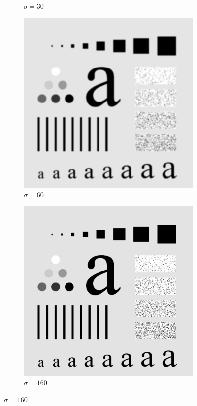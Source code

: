 \documentclass[
	12pt, %
]{style/fphw}
\begin{document}
\begin{figure}[H]
\begin{subfigure}[b]{.3\textwidth}
         \caption{$\sigma=30$}
         \label{Q5_2_lowpass_30}
     \end{subfigure}
     \hfill
     \begin{subfigure}[b]{.3\textwidth}
         \centering
         \includegraphics[width=\textwidth]{Q5_2_lowpass_60.png}
         \caption{$\sigma=60$}
         \label{Q5_2_lowpass_60}
     \end{subfigure}
     \hfill
     \begin{subfigure}[b]{.3\textwidth}
         \centering
         \includegraphics[width=\textwidth]{Q5_2_lowpass_160.png}
         \caption{$\sigma=160$}
         \label{Q5_2_lowpass_160}
     \end{subfigure}
     

\end{figure}
\end{document}
